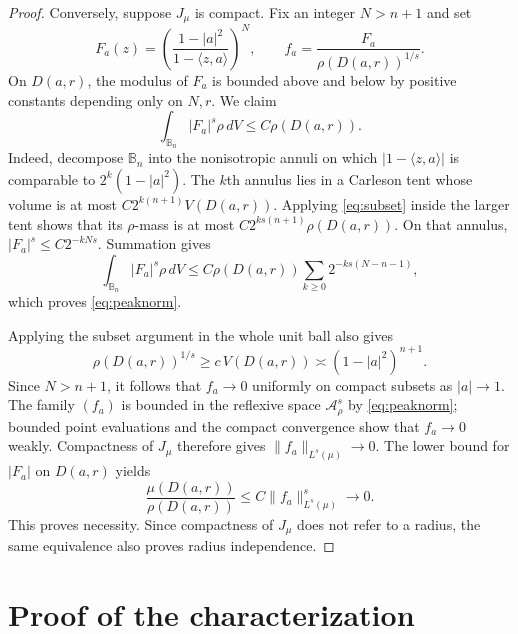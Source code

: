 \documentclass[11pt]{article}
\newcommand{\B}{\mathbb B_n}
\newcommand{\A}{\mathcal A}
\newcommand{\dd}{\,dV}
\begin{document}
\begin{proof}
Conversely, suppose $J_\mu$ is compact.  Fix an integer $N>n+1$ and set
\[
 F_a(z)=\left(\frac{1-|a|^2}{1-\langle z,a\rangle}\right)^N,
 \qquad
 f_a=\frac{F_a}{\rho(D(a,r))^{1/s}}.
\]
On $D(a,r)$, the modulus of $F_a$ is bounded above and below by positive
constants depending only on $N,r$.  We claim
\begin{equation}\label{eq:peaknorm}
             \int_{\B}|F_a|^s\rho\dd
             \le C\rho(D(a,r)).
\end{equation}
Indeed, decompose $\B$ into the nonisotropic annuli on which
$|1-\langle z,a\rangle|$ is comparable to
$2^k(1-|a|^2)$.  The $k$th annulus lies in a Carleson tent whose volume is
at most $C2^{k(n+1)}V(D(a,r))$.  Applying \eqref{eq:subset} inside the
larger tent shows that its $\rho$-mass is at most
$C2^{ks(n+1)}\rho(D(a,r))$.  On that annulus,
$|F_a|^s\le C2^{-kNs}$.  Summation gives
\[
 \int_{\B}|F_a|^s\rho\dd
 \le C\rho(D(a,r))
       \sum_{k\ge0}2^{-ks(N-n-1)},
\]
which proves \eqref{eq:peaknorm}.

Applying the subset argument in the whole unit ball also gives
\[
 \rho(D(a,r))^{1/s}\ge c\,V(D(a,r))
 \asymp (1-|a|^2)^{n+1}.
\]
Since $N>n+1$, it follows that $f_a\to0$ uniformly on compact subsets as
$|a|\to1$.  The family $(f_a)$ is bounded in the reflexive space
$\A^s_\rho$ by \eqref{eq:peaknorm}; bounded point evaluations and the
compact convergence show that $f_a\to0$ weakly.  Compactness of $J_\mu$
therefore gives $\|f_a\|_{L^s(\mu)}\to0$.  The lower bound for $|F_a|$ on
$D(a,r)$ yields
\[
 \frac{\mu(D(a,r))}{\rho(D(a,r))}
 \le C\|f_a\|_{L^s(\mu)}^s\longrightarrow0.
\]
This proves necessity.  Since compactness of $J_\mu$ does not refer to a
radius, the same equivalence also proves radius independence.
\end{proof}

\section{Proof of the characterization}
\end{document}
